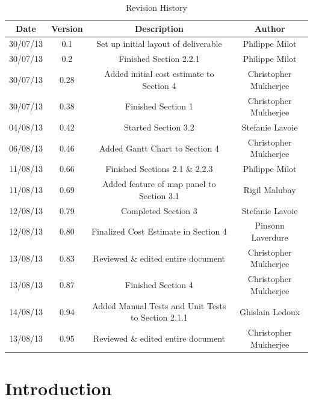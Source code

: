 \documentclass{article}
\begin{document}
\begin{table}[htbp]
\caption{Revision History}
\begin{center}
\begin{tabular}{|c | c | c | c| }
\hline
Date & Version & Description & Author \\
\hline\hline
30/07/13 & 0.1 & Set up initial layout of deliverable & Philippe Milot \\
\hline
30/07/13 & 0.2 & Finished Section 2.2.1 & Philippe Milot \\
\hline
30/07/13 & 0.28 & Added initial cost estimate to Section 4 & Christopher Mukherjee \\
\hline
30/07/13 & 0.38 & Finished Section 1 & Christopher Mukherjee \\
\hline
04/08/13 & 0.42 & Started Section 3.2 & Stefanie Lavoie \\
\hline
06/08/13 & 0.46 & Added Gantt Chart to Section 4 & Christopher Mukherjee \\
\hline
11/08/13 & 0.66 & Finished Sections 2.1 \& 2.2.3 & Philippe Milot \\
\hline
11/08/13 & 0.69 & Added feature of map panel to Section 3.1 & Rigil Malubay \\
\hline
12/08/13 & 0.79 & Completed Section 3 & Stefanie Lavoie \\
\hline
12/08/13 & 0.80 & Finalized Cost Estimate in Section 4 & Pinsonn Laverdure \\
\hline
13/08/13 & 0.83 & Reviewed \& edited entire document & Christopher Mukherjee \\
\hline
13/08/13 & 0.87 & Finished Section 4 & Christopher Mukherjee \\
\hline
14/08/13 & 0.94 & Added Manual Tests and Unit Tests to Section 2.1.1 & Ghislain Ledoux \\
\hline
13/08/13 & 0.95 & Reviewed \& edited entire document & Christopher Mukherjee \\
\hline
\end{tabular}
\end{center}
\end{table}

\clearpage

\tableofcontents
\clearpage


\section{Introduction} %
\end{document}
